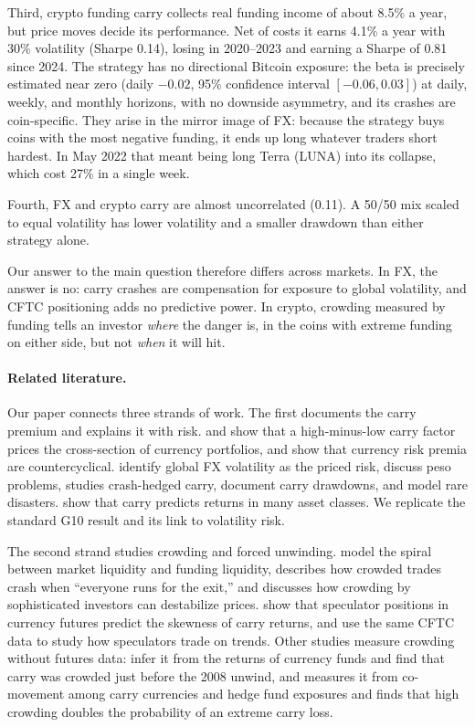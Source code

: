 \documentclass[11pt]{article}
\begin{document}
Third, crypto funding carry collects real funding income of about 8.5\% a year, but price moves decide its performance. Net of costs it earns 4.1\% a year with 30\% volatility (Sharpe 0.14), losing in 2020--2023 and earning a Sharpe of 0.81 since 2024. The strategy has no directional Bitcoin exposure: the beta is precisely estimated near zero (daily $-0.02$, 95\% confidence interval $[-0.06, 0.03]$) at daily, weekly, and monthly horizons, with no downside asymmetry, and its crashes are coin-specific. They arise in the mirror image of FX: because the strategy buys coins with the most negative funding, it ends up long whatever traders short hardest. In May 2022 that meant being long Terra (LUNA) into its collapse, which cost 27\% in a single week.

Fourth, FX and crypto carry are almost uncorrelated (0.11). A 50/50 mix scaled to equal volatility has lower volatility and a smaller drawdown than either strategy alone.

Our answer to the main question therefore differs across markets. In FX, the answer is no: carry crashes are compensation for exposure to global volatility, and CFTC positioning adds no predictive power. In crypto, crowding measured by funding tells an investor \emph{where} the danger is, in the coins with extreme funding on either side, but not \emph{when} it will hit.

\paragraph{Related literature.}
Our paper connects three strands of work. The first documents the carry premium and explains it with risk. \citet{LustigVerdelhan2007} and \citet{LRV2011} show that a high-minus-low carry factor prices the cross-section of currency portfolios, and \citet{LRV2014} show that currency risk premia are countercyclical. \citet{Menkhoff2012} identify global FX volatility as the priced risk, \citet{Burnside2011} discuss peso problems, \citet{Jurek2014} studies crash-hedged carry, \citet{DanielHodrickLu2017} document carry drawdowns, and \citet{Farhi2016} model rare disasters. \citet{Koijen2018} show that carry predicts returns in many asset classes. We replicate the standard G10 result and its link to volatility risk.

The second strand studies crowding and forced unwinding. \citet{BrunnermeierPedersen2009} model the spiral between market liquidity and funding liquidity, \citet{Pedersen2009} describes how crowded trades crash when ``everyone runs for the exit,'' and \citet{Stein2009} discusses how crowding by sophisticated investors can destabilize prices. \citet{BrunnermeierNagelPedersen2008} show that speculator positions in currency futures predict the skewness of carry returns, and \citet{Moskowitz2012} use the same CFTC data to study how speculators trade on trends. Other studies measure crowding without futures data: \citet{PojarlievLevich2011} infer it from the returns of currency funds and find that carry was crowded just before the 2008 unwind, and \citet{Sokolovski2016} measures it from co-movement among carry currencies and hedge fund exposures and finds that high crowding doubles the probability of an extreme carry loss.
\end{document}
